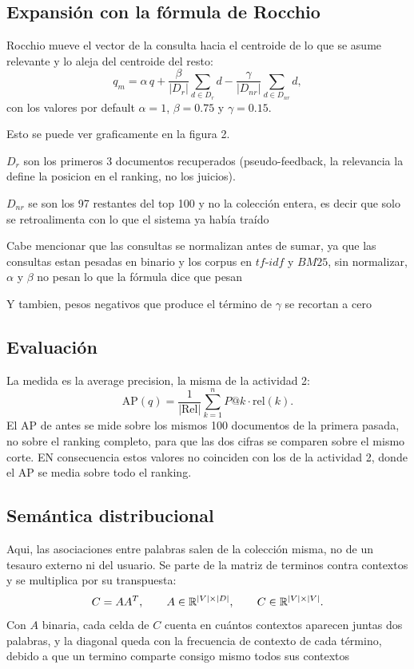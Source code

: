 \documentclass[11pt,letterpaper]{article}
\begin{document}
\subsection*{Expansión con la fórmula de Rocchio}

Rocchio mueve el vector de la consulta hacia el centroide de lo que se
asume relevante y lo aleja del centroide del resto:
\[
    q_m = \alpha\, q
        + \frac{\beta}{|D_r|} \sum_{d \in D_r} d
        - \frac{\gamma}{|D_{nr}|} \sum_{d \in D_{nr}} d ,
\]
con los valores por default $\alpha = 1$, $\beta = 0.75$ y
$\gamma = 0.15$.

Esto se puede ver graficamente en la figura 2.

$D_r$ son los primeros 3 documentos recuperados (pseudo-feedback,
la relevancia la define la posicion en el ranking, no los juicios).

$D_{nr}$ se son los 97 restantes del top 100 y no la colección entera, es decir que solo se
retroalimenta con lo que el sistema ya había traído

Cabe mencionar que las consultas se normalizan antes de sumar, ya que las
consultas estan pesadas en binario y los corpus en $tf$-$idf$ y $BM25$, sin normalizar,
$\alpha$ y $\beta$ no pesan lo que la fórmula dice que pesan

Y tambien, pesos negativos que produce el término de
$\gamma$ se recortan a cero

\subsection*{Evaluación}

La medida es la average precision, la misma de la actividad 2:
\[
    \mathrm{AP}(q) = \frac{1}{|\mathrm{Rel}|} \sum_{k=1}^{n}
                     P@k \cdot \mathrm{rel}(k) .
\]
El AP de antes se mide sobre los mismos 100 documentos de la primera
pasada, no sobre el ranking completo, para que las dos cifras se
comparen sobre el mismo corte. EN consecuencia estos valores no coinciden con
los de la actividad 2, donde el AP se media sobre todo el ranking.

\subsection*{Semántica distribucional}

Aqui, las asociaciones entre
palabras salen de la colección misma, no de un tesauro externo ni del
usuario. Se parte de la matriz de terminos contra contextos y se
multiplica por su transpuesta:
\[
    C = A A^{T},
    \qquad
    A \in \mathbb{R}^{|V| \times |D|},
    \qquad
    C \in \mathbb{R}^{|V| \times |V|} .
\]
Con $A$ binaria, cada celda de $C$ cuenta en cuántos contextos
aparecen juntas dos palabras, y la diagonal queda con la frecuencia de
contexto de cada término, debido a que un termino comparte consigo mismo
todos sus contextos
\end{document}
